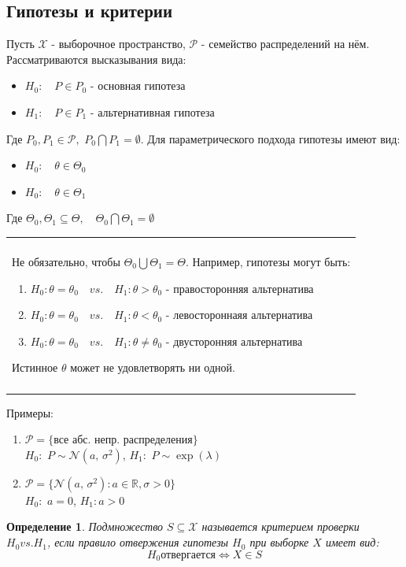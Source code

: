 \documentclass[a4paper,12pt]{article}
\newcommand{\normal}[2]{\mathcal{N}(#1,\,#2)}
\newcommand{\R}{\mathbb{R}}
\newenvironment{annotation}{\begin{center}
    \begin{tabular}{|p{0.9\textwidth}|}
    \hline\\
}
{ 
    \\\\\hline
    \end{tabular} 
    \end{center}
}
\newtheorem{dfn}{Определение}[section]
\theoremstyle{named}
\begin{document}
\subsection{Гипотезы и критерии}
Пусть $\mathcal{X}$ - выборочное пространство, $\mathcal{P}$ - семейство распределений на нём. Рассматриваются высказывания вида:
\begin{itemize}
    \item $H_0: \quad P \in P_0$ - основная гипотеза
    \item $H_1: \quad P \in P_1$ - альтернативная гипотеза 
\end{itemize}
Где $P_0, P_1 \in \mathcal{P}, \,\, P_0\bigcap P_1 = \emptyset$. Для параметрического подхода гипотезы имеют вид:
\begin{itemize}
    \item $H_0: \quad \theta \in \Theta_0$
    \item $H_0: \quad \theta \in \Theta_1$
\end{itemize}
Где $\Theta_0, \Theta_1 \subseteq \Theta, \quad \Theta_0 \bigcap \Theta_1 = \emptyset$
\begin{annotation}
    Не обязательно, чтобы $\Theta_0 \bigcup \Theta_1 = \Theta$. Например, гипотезы могут быть:
    \begin{enumerate}
        \item $H_0: \theta = \theta_0 \quad vs. \quad H_1: \theta > \theta_0$ - правосторонняя альтернатива
        \item $H_0: \theta = \theta_0 \quad vs. \quad H_1: \theta < \theta_0$ - левостороннаяя альтернатива
        \item $H_0: \theta = \theta_0 \quad vs. \quad H_1: \theta \neq \theta_0$ - двусторонняя альтернатива
    \end{enumerate}
    Истинное $\theta$ может не удовлетворять ни одной. 
\end{annotation} 
Примеры:
\begin{enumerate}
    \item $\mathcal{P} = \{$все абс. непр. распределения$\}$\\ $H_0: \,\, P \sim \normal{a}{\sigma^2}$, 
    $H_1: \,\, P \sim \exp(\lambda)$
    \item $\mathcal{P} = \{ \normal{a}{\sigma^2}: a \in \R, \sigma > 0\}$\\ $H_0: \,\, a = 0$, $H_1: a > 0$
\end{enumerate}
\begin{dfn}
    Подмножество $S\subseteq \mathcal{X}$ называется критерием проверки $H_0 vs. H_1$, если правило отвержения 
    гипотезы $H_0$ при выборке $X$ имеет вид:
    $$
        H_0 \text{отвергается} \Leftrightarrow X \in S
    $$
\end{dfn}
\end{document}
